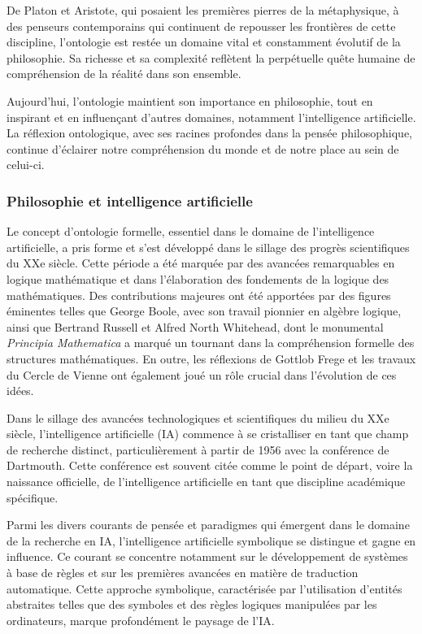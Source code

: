 \documentclass[12pt]{report}
\begin{document}
De Platon et Aristote, qui posaient les premières pierres de la métaphysique, à des penseurs contemporains qui continuent de repousser les frontières de cette discipline, l'ontologie est restée un domaine vital et constamment évolutif de la philosophie. Sa richesse et sa complexité reflètent la perpétuelle quête humaine de compréhension de la réalité dans son ensemble.

Aujourd'hui, l'ontologie maintient son importance en philosophie, tout en inspirant et en influençant d'autres domaines, notamment l'intelligence artificielle. La réflexion ontologique, avec ses racines profondes dans la pensée philosophique, continue d'éclairer notre compréhension du monde et de notre place au sein de celui-ci.
 
\subsubsection{Philosophie et intelligence artificielle}
Le concept d'ontologie formelle, essentiel dans le domaine de l'intelligence artificielle, a pris forme et s'est développé dans le sillage des progrès scientifiques du XXe siècle. Cette période a été marquée par des avancées remarquables en logique mathématique et dans l'élaboration des fondements de la logique des mathématiques. Des contributions majeures ont été apportées par des figures éminentes telles que George Boole, avec son travail pionnier en algèbre logique, ainsi que Bertrand Russell et Alfred North Whitehead, dont le monumental \textit{Principia Mathematica} a marqué un tournant dans la compréhension formelle des structures mathématiques. En outre, les réflexions de Gottlob Frege et les travaux du Cercle de Vienne ont également joué un rôle crucial dans l'évolution de ces idées.

Dans le sillage des avancées technologiques et scientifiques du milieu du XXe siècle, l'intelligence artificielle (IA) commence à se cristalliser en tant que champ de recherche distinct, particulièrement à partir de 1956 avec la conférence de Dartmouth. Cette conférence est souvent citée comme le point de départ, voire la naissance officielle, de l'intelligence artificielle en tant que discipline académique spécifique.

Parmi les divers courants de pensée et paradigmes qui émergent dans le domaine de la recherche en IA, l'intelligence artificielle symbolique se distingue et gagne en influence. Ce courant se concentre notamment sur le développement de systèmes à base de règles et sur les premières avancées en matière de traduction automatique. Cette approche symbolique, caractérisée par l'utilisation d'entités abstraites telles que des symboles et des règles logiques manipulées par les ordinateurs, marque profondément le paysage de l'IA.
\end{document}
